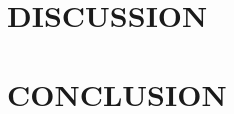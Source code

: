 \documentclass[a4paper,fleqn,spanish]{cas-dc}
\begin{document}
\section{DISCUSSION}\label{discusion}



\section{CONCLUSION}\label{conclucion}





%
%

%



%
\end{document}
